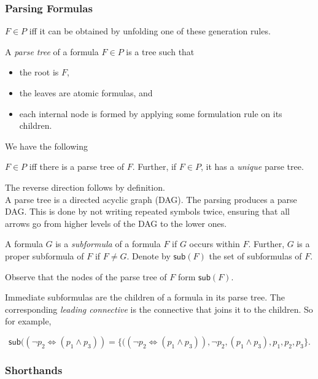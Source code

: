 \subsubsection{Parsing Formulas}

$F\in P$ iff it can be obtained by unfolding one of these generation rules.

\begin{definition}
A \textit{parse tree} of a formula $F\in P$ is a tree such that
\begin{itemize}
    \item the root is $F$,
    \item the leaves are atomic formulas, and
    \item each internal node is formed by applying some formulation rule on its children.
\end{itemize}
\end{definition}

We have the following 

\begin{theorem}
$F\in P$ iff there is a parse tree of $F$. Further, if $F\in P$, it has a \textit{unique} parse tree.
\end{theorem}
The reverse direction follows by definition.\\

A parse tree is a directed acyclic graph (DAG). The parsing produces a parse DAG. This is done by not writing repeated symbols twice, ensuring that all arrows go from higher levels of the DAG to the lower ones.

\begin{definition}
A formula $G$ is a \textit{subformula} of a formula $F$ if $G$ occurs within $F$. Further, $G$ is a proper subformula of $F$ if $F\neq G$. Denote by $\mathsf{sub}(F)$ the set of subformulas of $F$.
\end{definition}

Observe that the nodes of the parse tree of $F$ form $\mathsf{sub}(F)$.

Immediate subformulas are the children of a formula in its parse tree. The corresponding \textit{leading connective} is the connective that joins it to the children. So for example,

\[ \mathsf{sub}((\neg p_2 \iff (p_1 \wedge p_3)) = \{((\neg p_2 \iff (p_1 \wedge p_3)), \neg p_2, (p_1 \wedge p_3), p_1, p_2, p_3\}. \]

\subsubsection{Shorthands}

